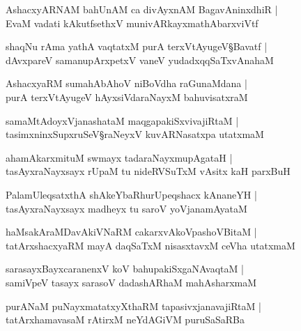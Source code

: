\begin{shloka}
AshacxyARNAM bahUnAM ca divAyxnAM BagavAninxdhiR |\\
EvaM vadati kAkutfsethxV munivARkayxmathAbarxviVtf
\end{shloka}

\begin{shloka}
shaqNu rAma yathA vaqtatxM purA terxVtAyugeV\S Bavatf |\\
dAvxpareV samanupArxpetxV vaneV yudadxqqSaTxvAnahaM 
\end{shloka}

\begin{shloka}
AshacxyaRM sumahAbAhoV niBoVdha raGunaMdana |\\
purA terxVtAyugeV hAyxsiVdaraNayxM bahuvisatxraM
\end{shloka}

\begin{shloka}
samaMtAdoyxVjanashataM maqgapakiSxvivajiRtaM |\\
tasimxninxSupxruSeV\S raNeyxV kuvARNasatxpa utatxmaM 
\end{shloka}

\begin{shloka}
ahamAkarxmituM swmayx tadaraNayxmupAgataH |\\
tasAyxraNayxsayx rUpaM tu nideRVSuTxM vAsitx kaH parxBuH 
\end{shloka}

\begin{shloka}
PalamUleqsatxthA shAkeYbaRhurUpeqshacx kAnaneYH |\\
tasAyxraNayxsayx madheyx tu saroV yoVjanamAyataM 
\end{shloka}

\begin{shloka}
haMsakAraMDavAkiVNaRM cakarxvAkoVpashoVBitaM |\\
tatArxshacxyaRM mayA daqSaTxM nisasxtavxM ceVha utatxmaM 
\end{shloka}

\begin{shloka}
sarasayxBayxcaranenxV koV bahupakiSxgaNAvaqtaM |\\
samiVpeV tasayx sarasoV dadashARhaM mahAsharxmaM 
\end{shloka}

\begin{shloka}
purANaM puNayxmatatxyXthaRM tapasivxjanavajiRtaM |\\
tatArxhamavasaM rAtirxM neYdAGiVM puruSaSaRBa
\end{shloka}

